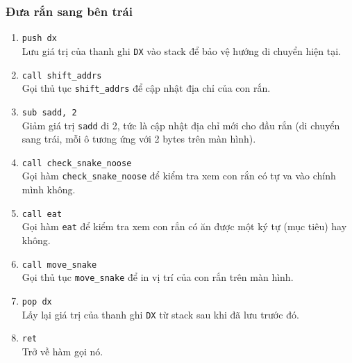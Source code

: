 \documentclass[12pt]{article}
\begin{document}
\subsubsection*{Đưa rắn sang bên trái}
\begin{enumerate}[label=\textbf{\arabic*.}]
      \begin{figure}[H]
  \centering
  \texttt{[image: pics/ml.png]}
\end{figure}
    \item \texttt{push dx} \\
    Lưu giá trị của thanh ghi \texttt{DX} vào stack để bảo vệ hướng di chuyển hiện tại.
    
    \item \texttt{call shift\_addrs} \\
    Gọi thủ tục \texttt{shift\_addrs} để cập nhật địa chỉ của con rắn.
    
    \item \texttt{sub sadd, 2} \\
    Giảm giá trị \texttt{sadd} đi 2, tức là cập nhật địa chỉ mới cho đầu rắn (di chuyển sang trái, mỗi ô tương ứng với 2 bytes trên màn hình).
    
    \item \texttt{call check\_snake\_noose} \\
    Gọi hàm \texttt{check\_snake\_noose} để kiểm tra xem con rắn có tự va vào chính mình không.
    
    \item \texttt{call eat} \\
    Gọi hàm \texttt{eat} để kiểm tra xem con rắn có ăn được một ký tự (mục tiêu) hay không.
    
    \item \texttt{call move\_snake} \\
    Gọi thủ tục \texttt{move\_snake} để in vị trí của con rắn trên màn hình.
    
    \item \texttt{pop dx} \\
    Lấy lại giá trị của thanh ghi \texttt{DX} từ stack sau khi đã lưu trước đó.
    
    \item \texttt{ret} \\
    Trở về hàm gọi nó.
\end{enumerate}
\end{document}
